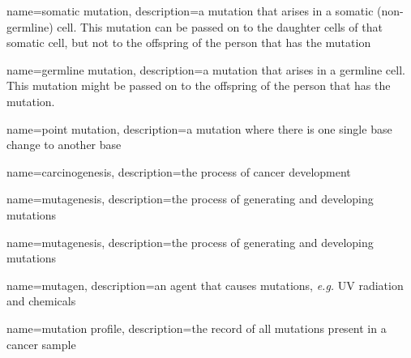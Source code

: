 {
        name=somatic mutation,
        description={a mutation that arises in a somatic (non-germline) cell. This mutation can be passed on to the daughter cells of that somatic cell, but not to the offspring of the person that has the mutation}
}

{
        name=germline mutation,
        description={a mutation that arises in a germline cell. This mutation might be passed on to the offspring of the person that has the mutation.}
}

{
        name=point mutation,
        description={a mutation where there is one single base change to another base}
}

{
        name=carcinogenesis,
        description={the process of cancer development}
}

{
        name=mutagenesis,
        description={the process of generating and developing mutations}
}

{
        name=mutagenesis,
        description={the process of generating and developing mutations}
}

{
        name=mutagen,
        description={an agent that causes mutations, \textit{e.g.} UV radiation and chemicals}
}


{
        name=mutation profile,
        description={the record of all mutations present in a cancer sample}
}